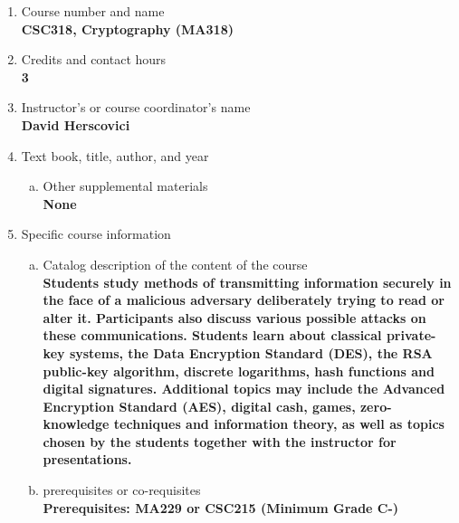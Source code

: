 \label{CSC318}  %
\begin{enumerate}[1.]
\item Course number and name\\
  {\bfseries
    CSC318, Cryptography (MA318)
  }
  
\item Credits and contact hours\\
  {\bfseries
    3  %
  }

\item Instructor's or course coordinator's name\\
  {\bfseries
    David Herscovici    
  }

\item Text book, title, author, and year\\
  {\bfseries
    
  }
\begin{enumerate}[a.]
\item Other supplemental materials\\
  {\bfseries
    None    
  }
\end{enumerate}

\item Specific course information
\begin{enumerate}[a.]  
\item Catalog description of the content of the course\\
  {\bfseries
Students study methods of transmitting information securely in the face of a malicious adversary deliberately trying to read or alter it. Participants also discuss various possible attacks on these communications. Students learn about classical private-key systems, the Data Encryption Standard (DES), the RSA public-key algorithm, discrete logarithms, hash functions and digital signatures. Additional topics may include the Advanced Encryption Standard (AES), digital cash, games, zero-knowledge techniques and information theory, as well as topics chosen by the students together with the instructor for presentations.    
  }

\item prerequisites or co-requisites\\
  {\bfseries
    Prerequisites: MA229 or CSC215 (Minimum Grade C-) 
  }


\end{enumerate}
\end{enumerate}
